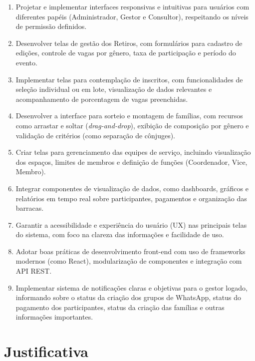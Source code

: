 \begin{enumerate}
    \item Projetar e implementar interfaces responsivas e intuitivas para usuários com diferentes papéis (Administrador, Gestor e Consultor), respeitando os níveis de permissão definidos.
    
    \item Desenvolver telas de gestão dos Retiros, com formulários para cadastro de edições, controle de vagas por gênero, taxa de participação e período do evento.
    
    \item Implementar telas para contemplação de inscritos, com funcionalidades de seleção individual ou em lote, visualização de dados relevantes e acompanhamento de porcentagem de vagas preenchidas.
    
    \item Desenvolver a interface para sorteio e montagem de famílias, com recursos como arrastar e soltar (\textit{drag-and-drop}), exibição de composição por gênero e validação de critérios (como separação de cônjuges).
    
    \item Criar telas para gerenciamento das equipes de serviço, incluindo visualização dos espaços, limites de membros e definição de funções (Coordenador, Vice, Membro).
    
    \item Integrar componentes de visualização de dados, como dashboards, gráficos e relatórios em tempo real sobre participantes, pagamentos e organização das barracas.
    
    \item Garantir a acessibilidade e experiência do usuário (UX) nas principais telas do sistema, com foco na clareza das informações e facilidade de uso.
    
    \item Adotar boas práticas de desenvolvimento front-end com uso de frameworks modernos (como React), modularização de componentes e integração com API REST.
    
    \item Implementar sistema de notificações claras e objetivas para o gestor logado, informando sobre o status da criação dos grupos de WhatsApp, status do pagamento dos participantes, status da criação das famílias e outras informações importantes.
\end{enumerate}

\section{Justificativa}

